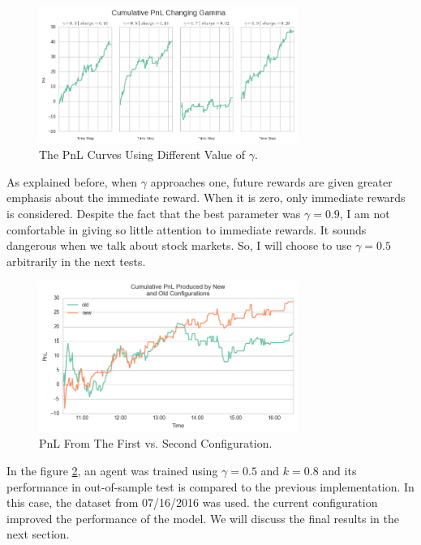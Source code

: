 \documentclass[a4paper]{article}
\begin{document}
\begin{figure}[ht]
\centering
\includegraphics[width=0.75\textwidth]{figures/optimize_gamma.png}
\caption{\label{fig:optimize_gamma}The PnL Curves Using Different Value of $\gamma$.}
\end{figure}

As explained before, when $\gamma$ approaches one, future rewards are given greater emphasis about the immediate reward. When it is zero, only immediate rewards is considered. Despite the fact that the best parameter was $\gamma = 0.9$, I am not comfortable in giving so little attention to immediate rewards. It sounds dangerous when we talk about stock markets. So, I will choose to use $\gamma = 0.5$ arbitrarily in the next tests.

\begin{figure}[ht]
\centering
\includegraphics[width=0.75\textwidth]{figures/old_new_comparition.png}
\caption{\label{fig:old_new_comparition}PnL From The First vs. Second Configuration.}
\end{figure}

In the figure \ref{fig:old_new_comparition}, an agent was trained using $\gamma=0.5$ and $k=0.8$ and its performance in out-of-sample test is compared to the previous implementation. In this case, the dataset from 07/16/2016 was used. the current configuration improved the performance of the model. We will discuss the final results in the next section.
\end{document}
